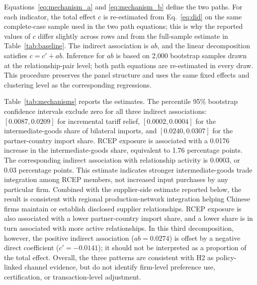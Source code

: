 \documentclass[preprint,12pt,authoryear]{elsarticle}
\begin{document}
Equations~\eqref{eq:mechanism_a} and \eqref{eq:mechanism_b} define the two paths. For each indicator, the total effect $c$ is re-estimated from Eq.~\eqref{eq:did} on the same complete-case sample used in the two path equations; this is why the reported values of $c$ differ slightly across rows and from the full-sample estimate in Table~\ref{tab:baseline}. The indirect association is $ab$, and the linear decomposition satisfies $c=c'+ab$. Inference for $ab$ is based on 2,000 bootstrap samples drawn at the relationship-pair level; both path equations are re-estimated in every draw. This procedure preserves the panel structure and uses the same fixed effects and clustering level as the corresponding regressions.

Table~\ref{tab:mechanisms} reports the estimates. The percentile 95\% bootstrap confidence intervals exclude zero for all three indirect associations: $[0.0087,0.0209]$ for incremental tariff relief, $[0.0002,0.0004]$ for the intermediate-goods share of bilateral imports, and $[0.0240,0.0307]$ for the partner-country import share. RCEP exposure is associated with a 0.0176 increase in the intermediate-goods share, equivalent to 1.76 percentage points. The corresponding indirect association with relationship activity is 0.0003, or 0.03 percentage points. This estimate indicates stronger intermediate-goods trade integration among RCEP members, not increased input purchases by any particular firm. Combined with the supplier-side estimate reported below, the result is consistent with regional production-network integration helping Chinese firms maintain or establish disclosed supplier relationships. RCEP exposure is also associated with a lower partner-country import share, and a lower share is in turn associated with more active relationships. In this third decomposition, however, the positive indirect association ($ab=0.0274$) is offset by a negative direct coefficient ($c'=-0.0141$); it should not be interpreted as a proportion of the total effect. Overall, the three patterns are consistent with H2 as policy-linked channel evidence, but do not identify firm-level preference use, certification, or transaction-level adjustment.
\end{document}
